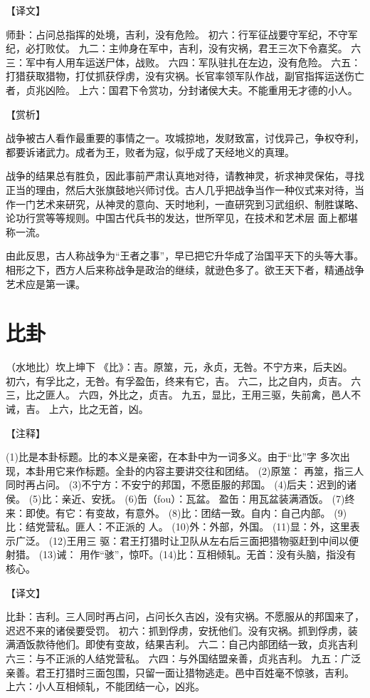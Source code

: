 \documentclass[12pt,UTF8]{ctexbook}
\begin{document}
【译文】

师卦：占问总指挥的处境，吉利，没有危险。
初六：行军征战要守军纪，不守军纪，必打败仗。
九二：主帅身在军中，吉利，没有灾祸，君王三次下令嘉奖。
六三：军中有人用车运送尸体，战败。
六四：军队驻扎在左边，没有危险。
六五：打猎获取猎物，打仗抓获俘虏，没有灾祸。长官率领军队作战，副官指挥运送伤亡者，贞兆凶险。
上六：国君下令赏功，分封诸侯大夫。不能重用无才德的小人。

【赏析】

战争被古人看作最重要的事情之一。攻城掠地，发财致富，讨伐异己，争权夺利，都要诉诸武力。成者为王，败者为寇，似乎成了天经地义的真理。

战争的结果总有胜负，因此事前严肃认真地对待，请教神灵，祈求神灵保佑，寻找正当的理由，然后大张旗鼓地兴师讨伐。古人几乎把战争当作一种仪式来对待，当作一门艺术来研究，从神灵的意向、天时地利，一直研究到习武组织、制胜谋略、论功行赏等等规则。中国古代兵书的发达，世所罕见，在技术和艺术层 面上都堪称一流。

由此反思，古人称战争为“王者之事”，早已把它升华成了治国平天下的头等大事。相形之下，西方人后来称战争是政治的继续，就逊色多了。欲王天下者，精通战争艺术应是第一课。

\chapter{比卦}

（水地比）坎上坤下
《比》：吉。原筮，元，永贞，无咎。不宁方来，后夫凶。
初六，有孚比之，无咎。有孚盈缶，终来有它，吉。
六二，比之自内，贞吉。
六三，比之匪人。
六四，外比之，贞吉。
九五，显比，王用三驱，失前禽，邑人不诫，吉。
上六，比之无首，凶。

【注释】

(1)比是本卦标题。比的本义是亲密，在本卦中为一词多义。由于“比”字 多次出现，本卦用它来作标题。全卦的内容主要讲交往和团结。
(2)原筮： 再筮，指三人同时再占问。
(3)不宁方：不安宁的邦国，不愿臣服的邦国。
(4)后夫：迟到的诸侯。
(5)比：亲近、安抚。
(6)缶（fou）：瓦盆。 盈缶：用瓦盆装满酒饭。
(7)终来：即使。有它：有变故，有意外。
(8)比：团结一致。自内：自己内部。
(9)比：结党营私。匪人：不正派的 人。
(10)外：外部，外国。
(11)显：外，这里表示广泛。
(12)王用三 驱：君王打猎时让卫队从左右后三面把猎物驱赶到中间以便射猎。
(13)诫： 用作“骇”，惊吓。(14)比：互相倾轧。无首：没有头脑，指没有核心。

【译文】

比卦：吉利。三人同时再占问，占问长久吉凶，没有灾祸。不愿服从的邦国来了，迟迟不来的诸侯要受罚。
初六：抓到俘虏，安抚他们。没有灾祸。抓到俘虏，装满酒饭款待他们。即使有变故，结果吉利。
六二：自己内部团结一致，贞兆吉利
六三：与不正派的人结党营私。
六四：与外国结盟亲善，贞兆吉利。
九五：广泛亲善。君王打猎时三面包围，只留一面让猎物逃走。邑中百姓毫不惊骇，吉利。 上六：小人互相倾轧，不能团结一心，凶兆。
\end{document}
